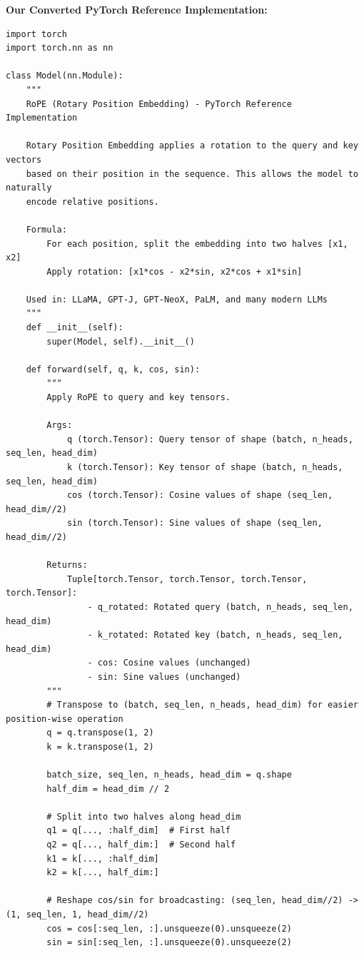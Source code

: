 \textbf{Our Converted PyTorch Reference Implementation:}
\begin{mdframed}[linewidth=1pt, linecolor=black, backgroundcolor=gray!5]
\begin{lstlisting}
import torch
import torch.nn as nn

class Model(nn.Module):
    """
    RoPE (Rotary Position Embedding) - PyTorch Reference Implementation

    Rotary Position Embedding applies a rotation to the query and key vectors
    based on their position in the sequence. This allows the model to naturally
    encode relative positions.

    Formula:
        For each position, split the embedding into two halves [x1, x2]
        Apply rotation: [x1*cos - x2*sin, x2*cos + x1*sin]

    Used in: LLaMA, GPT-J, GPT-NeoX, PaLM, and many modern LLMs
    """
    def __init__(self):
        super(Model, self).__init__()

    def forward(self, q, k, cos, sin):
        """
        Apply RoPE to query and key tensors.

        Args:
            q (torch.Tensor): Query tensor of shape (batch, n_heads, seq_len, head_dim)
            k (torch.Tensor): Key tensor of shape (batch, n_heads, seq_len, head_dim)
            cos (torch.Tensor): Cosine values of shape (seq_len, head_dim//2)
            sin (torch.Tensor): Sine values of shape (seq_len, head_dim//2)

        Returns:
            Tuple[torch.Tensor, torch.Tensor, torch.Tensor, torch.Tensor]:
                - q_rotated: Rotated query (batch, n_heads, seq_len, head_dim)
                - k_rotated: Rotated key (batch, n_heads, seq_len, head_dim)
                - cos: Cosine values (unchanged)
                - sin: Sine values (unchanged)
        """
        # Transpose to (batch, seq_len, n_heads, head_dim) for easier position-wise operation
        q = q.transpose(1, 2)
        k = k.transpose(1, 2)

        batch_size, seq_len, n_heads, head_dim = q.shape
        half_dim = head_dim // 2

        # Split into two halves along head_dim
        q1 = q[..., :half_dim]  # First half
        q2 = q[..., half_dim:]  # Second half
        k1 = k[..., :half_dim]
        k2 = k[..., half_dim:]

        # Reshape cos/sin for broadcasting: (seq_len, head_dim//2) -> (1, seq_len, 1, head_dim//2)
        cos = cos[:seq_len, :].unsqueeze(0).unsqueeze(2)
        sin = sin[:seq_len, :].unsqueeze(0).unsqueeze(2)


\end{lstlisting}
\end{mdframed}
